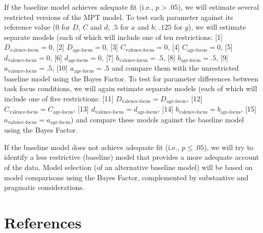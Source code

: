\documentclass[
  doc,floatsintext]{apa6}
\begin{document}
If the baseline model achieves adequate fit (i.e., \(p > .05\)),
we will estimate several restricted versions of the MPT model.
To test each parameter against its reference value (\(0\) for \(D\), \(C\) and \(d\); \(.5\) for \(a\) and \(b\); \(.125\) for \(g\)),
we will estimate separate models (each of which will include one of ten restrictions:
{[}1{]} \(D_\textrm{valence-focus}=0\),
{[}2{]} \(D_\textrm{age-focus}=0\),
{[}3{]} \(C_\textrm{valence-focus}=0\),
{[}4{]} \(C_\textrm{age-focus}=0\),
{[}5{]} \(d_\textrm{valence-focus}=0\),
{[}6{]} \(d_\textrm{age-focus}=0\),
{[}7{]} \(b_\textrm{valence-focus}=.5\),
{[}8{]} \(b_\textrm{age-focus}=.5\),
{[}9{]} \(a_\textrm{valence-focus}=.5\),
{[}10{]} \(a_\textrm{age-focus}=.5\)
and compare them with the unrestricted baseline model using the Bayes Factor.
To test for parameter differences between task focus conditions,
we will again estimate separate models (each of which will include one of five restrictions:
{[}11{]} \(D_\textrm{valence-focus}=D_\textrm{age-focus}\),
{[}12{]} \(C_\textrm{valence-focus}=C_\textrm{age-focus}\),
{[}13{]} \(d_\textrm{valence-focus}=d_\textrm{age-focus}\),
{[}14{]} \(b_\textrm{valence-focus}=b_\textrm{age-focus}\),
{[}15{]} \(a_\textrm{valence-focus}=a_\textrm{age-focus}\))
and compare these models against the baseline model using the Bayes Factor.

If the baseline model does not achieve adequate fit (i.e., \(p \leq .05\)),
we will try to identify a less restrictive (baseline) model that provides a more adequate account of the data.
Model selection (of an alternative baseline model) will be based on model comparisons using the Bayes Factor,
complemented by substantive and pragmatic considerations.

\hypertarget{references}{%
\section{References}\label{references}}
\end{document}

